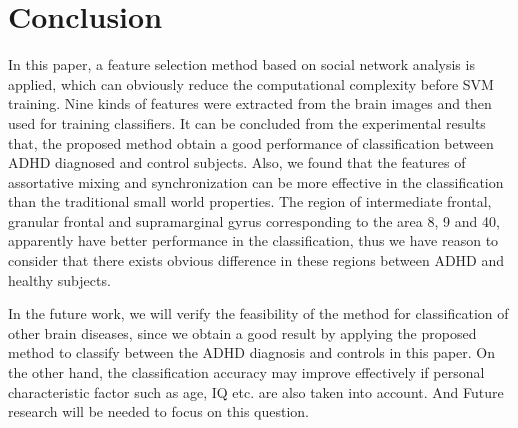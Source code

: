 \documentclass{llncs}
\begin{document}
\section{Conclusion}
In this paper, a feature selection method based on social network analysis is applied, which can obviously reduce the computational complexity before SVM training. Nine kinds of features were extracted from the brain images and then used for training classifiers. It can be concluded from the experimental results that, the proposed method obtain a good performance of classification between ADHD diagnosed and control subjects. Also, we found that the features of assortative mixing and synchronization can be more effective in the classification than the traditional small world properties. The region of intermediate frontal, granular frontal and supramarginal gyrus corresponding to the area 8, 9 and 40, apparently have better performance in the classification, thus we have reason to consider that there exists obvious difference in these regions between ADHD and healthy subjects.


In the future work, we will verify the feasibility of the method for classification of other brain diseases, since we obtain a good result by applying the proposed method to classify between the ADHD diagnosis and controls in this paper. On the other hand, the classification accuracy may improve effectively if personal characteristic factor such as age, IQ etc. are also taken into account. And Future research will be needed to focus on this question.
\end{document}
